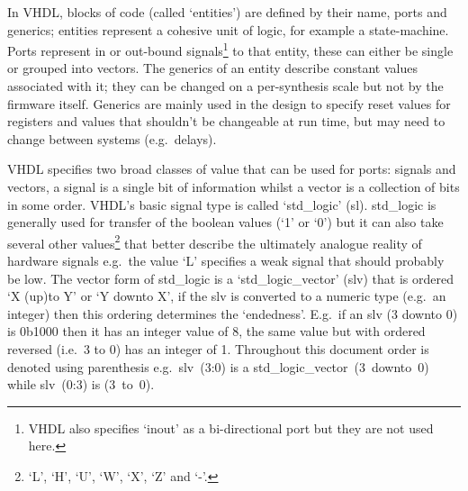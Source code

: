 In VHDL, blocks of code (called `entities') are defined by their name, ports and generics; entities represent a cohesive unit of logic, for example a state-machine. Ports represent in or out-bound signals\footnote{VHDL also specifies `inout' as a bi-directional port but they are not used here.} to that entity, these can either be single or grouped into vectors. The generics of an entity describe constant values associated with it; they can be changed on a per-synthesis scale but not by the firmware itself. Generics are mainly used in the design to specify reset values for registers and values that shouldn't be changeable at run time, but may need to change between systems (e.g.\ delays). 

VHDL specifies two broad classes of value that can be used for ports: signals and vectors, a signal is a single bit of information whilst a vector is a collection of bits in some order. VHDL's basic signal type is called `std\_logic' (sl). std\_logic is generally used for transfer of the boolean values (`1' or `0') but it can also take several other values\footnote{`L', `H', `U', `W', `X', `Z' and `-'.} that better describe the ultimately analogue reality of hardware signals e.g.\ the value `L' specifies a weak signal that should probably be low. The vector form of std\_logic is a `std\_logic\_vector' (slv) that is ordered `X (up)to Y' or `Y downto X', if the slv is converted to a numeric type (e.g.\ an integer) then this ordering determines the `endedness'. E.g.\ if an slv (3 downto 0) is 0b1000 then it has an integer value of 8, the same value but with ordered reversed (i.e.\ 3 to 0) has an integer of 1. Throughout this document order is denoted using parenthesis e.g.\ slv~(3:0) is a std\_logic\_vector~(3~downto~0) while slv~(0:3) is (3~to~0).
